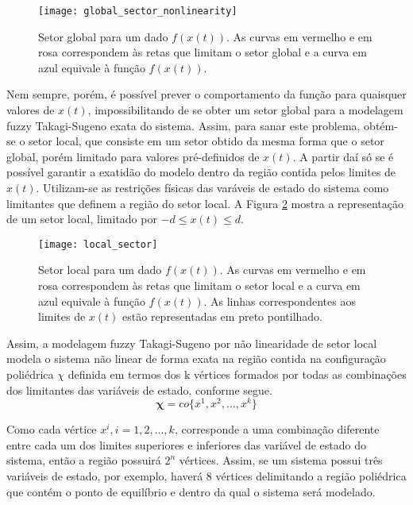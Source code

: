 \begin{figure}[htbp]
	\centering
	\texttt{[image: global\_sector\_nonlinearity]}
	\caption{Setor global para um dado $f(x(t))$. As curvas em vermelho e em rosa correspondem às retas que limitam o setor global e a curva em azul equivale à função $f(x(t))$.}
	 \label{fig:setor_global}
\end{figure}

Nem sempre, porém, é possível prever o comportamento da função para quaisquer valores de $x(t)$, impossibilitando de se obter um setor global para a modelagem fuzzy Takagi-Sugeno exata do sistema. Assim, para sanar este problema, obtém-se o setor local, que consiste em um setor obtido da mesma forma que o setor global, porém limitado para valores pré-definidos de $x(t)$. A partir daí só se é possível garantir a exatidão do modelo dentro da região contida pelos limites de $x(t)$. Utilizam-se as restrições físicas das varáveis de estado do sistema como limitantes que definem a região do setor local. A Figura \ref{fig:setor_local} mostra a representação de um setor local, limitado por $-d \leq x(t) \leq d$.

\begin{figure}[htbp]
	\centering
	\texttt{[image: local\_sector]}
	\caption{Setor local para um dado $f(x(t))$. As curvas em vermelho e em rosa correspondem às retas que limitam o setor local e a curva em azul equivale à função $f(x(t))$. As linhas correspondentes aos limites de $x(t)$ estão representadas em preto pontilhado.}
	 \label{fig:setor_local}
\end{figure}

Assim, a modelagem fuzzy Takagi-Sugeno por não linearidade de setor local modela o sistema não linear de forma exata na região contida na configuração poliédrica $\chi$ definida em termos dos k vértices formados por todas as combinações dos limitantes das variáveis de estado, conforme segue.
\begin{equation}\label{eq:rep_poliedrica_por_vertices}
\mathbf{\chi} = co\{x^1, x^2, ... , x^k\}
\end{equation}

Como cada vértice $x^i, i = 1, 2, ..., k$, corresponde a uma combinação diferente entre cada um dos limites superiores e inferiores das variável de estado do sistema, então a região possuirá  $2^n$ vértices. Assim, se um sistema possui três variáveis de estado, por exemplo, haverá 8 vértices delimitando a região poliédrica que contém o ponto de equilíbrio e dentro da qual o sistema será modelado.

